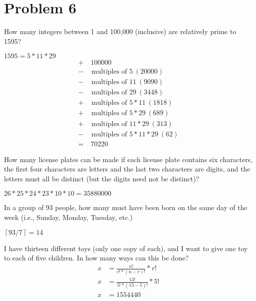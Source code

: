 \documentclass{article}
\newenvironment{problem}[1]{
  \nobreak\section*{Problem #1}
}{}
\begin{document}
  \begin{problem}{6}
    How many integers between 1 and 100,000 (inclusive) are relatively prime to 1595?
    \begin{center}
      $1595 = 5 * 11 * 29$
      \begin{equation*}
        \begin{split}
          + &\ 100000\\
          - & \text{ multiples of } 5\ (20000)\\
          - & \text{ multiples of } 11\ (9090)\\
          - & \text{ multiples of } 29\ (3448)\\
          + & \text{ multiples of } 5 * 11\ (1818)\\
          + & \text{ multiples of } 5 * 29\ (689)\\
          + & \text{ multiples of } 11 * 29\ (313)\\
          - & \text{ multiples of } 5 * 11 * 29\ (62)\\
          = &\ 70220
        \end{split}
      \end{equation*}
    \end{center}

    How many license plates can be made if each license plate contains six characters, the first four characters are letters and the last two characters are digits, and the letters must all be distinct (but the digits need not be distinct)?
    \begin{center}
      $26 * 25 * 24 * 23 * 10 * 10 = 35880000$
    \end{center}

    In a group of 93 people, how many must have been born on the same day of the week (i.e., Sunday, Monday, Tuesday, etc.)
    \begin{center}
      $\left \lceil{93/7}\right \rceil = 14$
    \end{center}

    I have thirteen different toys (only one copy of each), and I want to give one toy to each of five children. In how many ways can this be done?
    \begin{equation*}
      \begin{split}
        x & = \frac{n!}{r! * (n - r)!} * r!\\
        x & = \frac{13!}{5! * (13 - 5)!} * 5!\\
        x & = 1554440
      \end{split}
    \end{equation*}
  \end{problem}
\end{document}
